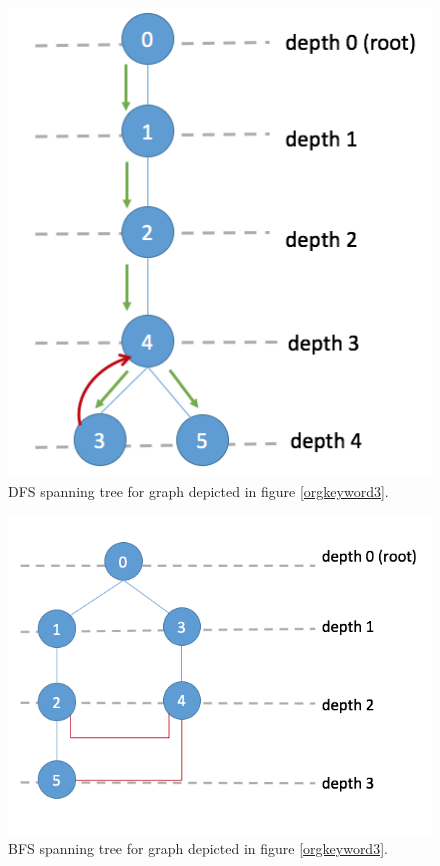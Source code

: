\documentclass[11pt]{article}
\begin{document}
\begin{figure}[htb]
\centering
\includegraphics[width=.9\linewidth]{data_structure/spanning_tree_DFS.png}
\caption{DFS spanning tree for graph depicted in figure \ref{orgkeyword3}.}
\end{figure}

\begin{figure}[htb]
\centering
\includegraphics[width=.9\linewidth]{data_structure/spanning_tree_BFS.png}
\caption{BFS spanning tree for graph depicted in figure \ref{orgkeyword3}.}
\end{figure}
\end{document}
